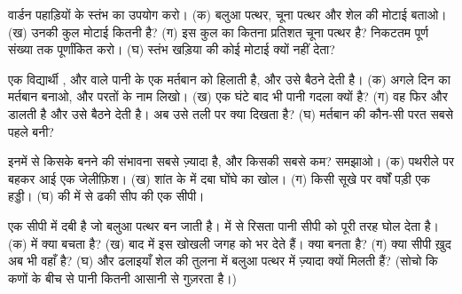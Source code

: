 \begin{exercise}[$\star\star$]\label{exo:g7:sediments-and-fossils:5}
वार्डन पहाड़ियों के स्तंभ का उपयोग करो। (क) बलुआ पत्थर, चूना पत्थर और शेल की
मोटाई बताओ। (ख) उनकी कुल मोटाई कितनी है? (ग) इस कुल का कितना प्रतिशत चूना
पत्थर है? निकटतम पूर्ण संख्या तक पूर्णांकित करो। (घ) स्तंभ खड़िया की कोई मोटाई
क्यों नहीं देता?
\end{exercise}

\begin{exercise}[$\star\star$]\label{exo:g7:sediments-and-fossils:6}
एक विद्यार्थी ,  और  वाले पानी के एक मर्तबान को हिलाती है, और उसे
बैठने देती है। (क) अगले दिन का मर्तबान बनाओ, और परतों के नाम लिखो। (ख) एक घंटे
बाद भी पानी गदला क्यों है? (ग) वह फिर  और  डालती है और उसे बैठने देती है।
अब उसे तली पर क्या दिखता है? (घ) मर्तबान की कौन-सी परत सबसे पहले
बनी?
\end{exercise}

\begin{exercise}[$\star\star$]\label{exo:g7:sediments-and-fossils:7}
इनमें से किसके  बनने की संभावना सबसे ज़्यादा है, और किसकी सबसे कम? समझाओ।
(क) पथरीले  पर बहकर आई एक जेलीफ़िश। (ख) शांत  के  में दबा घोंघे का
खोल। (ग) किसी सूखे  पर वर्षों पड़ी एक हड्डी। (घ)  की  में  से ढकी
सीप की एक सीपी।
\end{exercise}

\begin{exercise}[$\star\star$]\label{exo:g7:sediments-and-fossils:8}
एक सीपी  में दबी है जो बलुआ पत्थर बन जाती है।  में से रिसता पानी सीपी को
पूरी तरह घोल देता है। (क)  में क्या बचता है? (ख) बाद में  इस खोखली जगह
को भर देते हैं। क्या बनता है? (ग) क्या सीपी ख़ुद अब भी वहाँ है? (घ)  और
ढलाइयाँ शेल की तुलना में बलुआ पत्थर में ज़्यादा क्यों मिलती हैं? (सोचो कि कणों के
बीच से पानी कितनी आसानी से गुज़रता है।)
\end{exercise}

